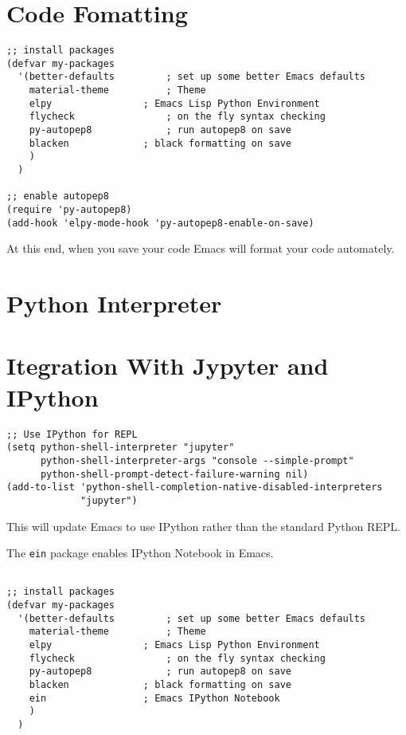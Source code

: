 \section{Code Fomatting}

\begin{lstlisting}
;; install packages
(defvar my-packages
  '(better-defaults			; set up some better Emacs defaults
    material-theme			; Theme
    elpy				; Emacs Lisp Python Environment
    flycheck				; on the fly syntax checking
    py-autopep8				; run autopep8 on save
    blacken				; black formatting on save
    )
  )

;; enable autopep8
(require 'py-autopep8)
(add-hook 'elpy-mode-hook 'py-autopep8-enable-on-save)

\end{lstlisting}

At this end, when you save your code Emacs will format your code automately.

\section{Python Interpreter}




\section{Itegration With Jypyter and IPython}
\begin{lstlisting}
;; Use IPython for REPL
(setq python-shell-interpreter "jupyter"
      python-shell-interpreter-args "console --simple-prompt"
      python-shell-prompt-detect-failure-warning nil)
(add-to-list 'python-shell-completion-native-disabled-interpreters
             "jupyter")
\end{lstlisting}

This will update Emacs to use IPython rather than the standard Python REPL.


The \verb|ein| package enables IPython Notebook in Emacs.
\begin{lstlisting}
  
;; install packages
(defvar my-packages
  '(better-defaults			; set up some better Emacs defaults
    material-theme			; Theme
    elpy				; Emacs Lisp Python Environment
    flycheck				; on the fly syntax checking
    py-autopep8				; run autopep8 on save
    blacken				; black formatting on save
    ein					; Emacs IPython Notebook
    )
  )

\end{lstlisting}

